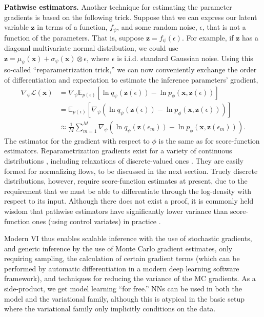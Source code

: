 {\bfseries Pathwise estimators.} Another technique for estimating the parameter gradients is based on the following trick. Suppose that we can express our latent variable $\mathbf{z}$ in terms of a function, $f_\psi$, and some random noise, $\epsilon$, that is not a function of the parameters. That is, suppose $\mathbf{z}=f_\psi(\epsilon)$. For example, if $\mathbf{z}$ has a diagonal multivariate normal distribution, we could use $\mathbf{z}=\mu_\psi(\mathbf{x}) + \sigma_\psi(\mathbf{x})\otimes\epsilon$, where $\epsilon$ is i.i.d. standard Gaussian noise. Using this so-called ``reparametrization trick,'' we can now conveniently exchange the order of differentiation and expectation to estimate the inference parameters' gradient,
\begin{align*}
	\nabla_\psi\mathcal{L}(\mathbf{x}) &= \nabla_\psi\mathbb{E}_{p(\epsilon)}\left[\ln q_\psi(\mathbf{z}(\epsilon)) - \ln p_\phi(\mathbf{x},\mathbf{z}(\epsilon))\right]\\
	&= \mathbb{E}_{p(\epsilon)}\left[\nabla_\psi\left(\ln q_\psi(\mathbf{z}(\epsilon)) - \ln p_\phi(\mathbf{x},\mathbf{z}(\epsilon))\right)\right]\\
	&\approx \frac{1}{M}\sum^M_{m=1}\nabla_\psi\left(\ln q_\psi(\mathbf{z}(\epsilon_m)) - \ln p_\phi(\mathbf{x},\mathbf{z}(\epsilon_m))\right).
\end{align*}
The estimator for the gradient with respect to $\phi$ is the same as for score-function estimators. Reparametrization gradients exist for a variety of continuous distributions \citep{figurnov2018implicit}, including relaxations of discrete-valued ones \citep{MaddisonEtAl2016, JangEtAl2016}. They are easily formed for normalizing flows, to be discussed in the next section. Truely discrete distributions, however, require score-function estimates at present, due to the requirement that we must be able to differentiate through the log-density with respect to its input. Although there does not exist a proof, it is commonly held wisdom that pathwise estimators have significantly lower variance than score-function ones (using control variates) in practice \citep{ruiz2016generalized}.\vspace{6pt}

Modern VI thus enables scalable inference with the use of stochastic gradients, and generic inference by the use of Monte Carlo gradient estimates, only requiring sampling, the calculation of certain gradient terms (which can be performed by automatic differentiation in a modern deep learning software framework), and techniques for reducing the variance of the MC gradients. As a side-product, we get model learning ``for free.'' NNs can be used in both the model and the variational family, although this is atypical in the basic setup where the variational family only implicitly conditions on the data.

